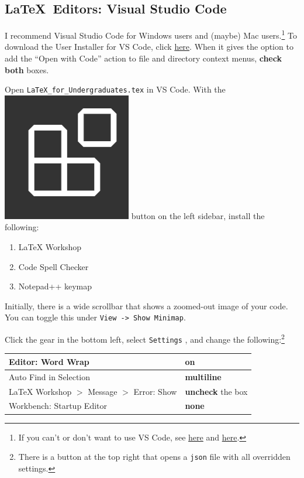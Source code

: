 \documentclass{article} 		%
\begin{document}
\subsection{\LaTeX\ Editors: Visual Studio Code} \label{subsec:editors}
I recommend Visual Studio Code for Windows users and (maybe) Mac users.\footnote{
	If you can't or don't want to use VS Code, see \href{https://en.wikipedia.org/wiki/Comparison_of_TeX_editors}{here} and \href{https://tex.stackexchange.com/questions/339/latex-editors-ides}{here}.
} 
To download the User Installer for VS Code, click \href{https://code.visualstudio.com/download}{here}. When it gives the option to add the ``Open with Code'' action to file and directory context menus, \textbf{check both} boxes. \par
Open \texttt{LaTeX\_for\_Undergraduates.tex} in VS Code. With the \includegraphics[scale=0.06]{marketplace.png} button on the left sidebar, install the following:
\begin{enumerate}
	\item[]
	LaTeX Workshop

	\item[]
	Code Spell Checker

	\item[]
	Notepad++ keymap
\end{enumerate}

Initially, there is a wide scrollbar that shows a zoomed-out image of your code. You can toggle this under \texttt{View -> Show Minimap}. \par
Click the gear in the bottom left, select \texttt{Settings}
, and change the following:\footnote{
	There is a button at the top right that opens a \texttt{json} file with all overridden settings. 
}
\begin{center}
	\begin{tabular}{|l|l|}
		\hline
		Editor: Word Wrap & \textbf{on} \\ \hline
		Auto Find in Selection & \textbf{multiline} \\ \hline
		LaTeX Workshop $>$ Message $>$ Error: Show & \textbf{uncheck} the box \\ \hline
		Workbench: Startup Editor & \textbf{none} \\ \hline
	\end{tabular}
\end{center}
\end{document}
